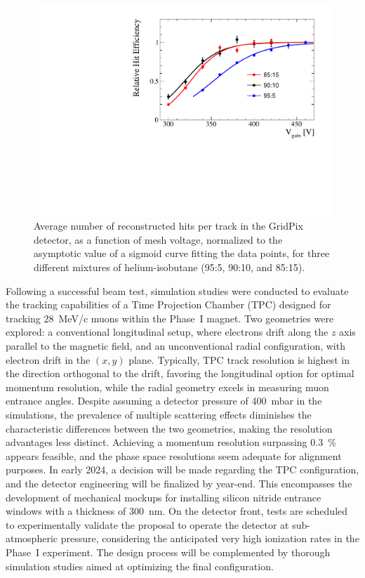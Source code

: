 \begin{refsection}
        \begin{figure}
            \centering
            \includegraphics[width=0.5 \linewidth]{Figures/muEDM/gridpix_plateau.pdf}    
            \caption{Average number of reconstructed hits per track in the GridPix detector, as a function of mesh voltage, normalized to the asymptotic value of a sigmoid curve fitting the data points, for three different mixtures of helium-isobutane (95:5, 90:10, and 85:15).}
            \label{fig:gridpix_plateau}
        \end{figure}
        
        Following a successful beam test, simulation studies were conducted to evaluate the tracking capabilities of a Time Projection Chamber (TPC) designed for tracking \SI{28}{MeV/c} muons within the Phase~I magnet. 
        Two geometries were explored: a conventional longitudinal setup, where electrons drift along the $z$ axis parallel to the magnetic field, and an unconventional radial configuration, with electron drift in the $(x,y)$ plane. 
        Typically, TPC track resolution is highest in the direction orthogonal to the drift, favoring the longitudinal option for optimal momentum resolution, while the radial geometry excels in measuring muon entrance angles. 
        Despite assuming a detector pressure of \SI{400}{\milli\bar} in the simulations, the prevalence of multiple scattering effects diminishes the characteristic differences between the two geometries, making the resolution advantages less distinct.
        Achieving a momentum resolution surpassing \SI{0.3}{\percent} appears feasible, and the phase space resolutions seem adequate for alignment purposes. 
        In early 2024, a decision will be made regarding the TPC configuration, and the detector engineering will be finalized by year-end. 
        This encompasses the development of mechanical mockups for installing silicon nitride entrance windows with a thickness of \SI{300}{\nano\meter}. 
        On the detector front, tests are scheduled to experimentally validate the proposal to operate the detector at sub-atmospheric pressure, considering the anticipated very high ionization rates in the Phase~I experiment. 
        The design process will be complemented by thorough simulation studies aimed at optimizing the final configuration.
        

\end{refsection}
